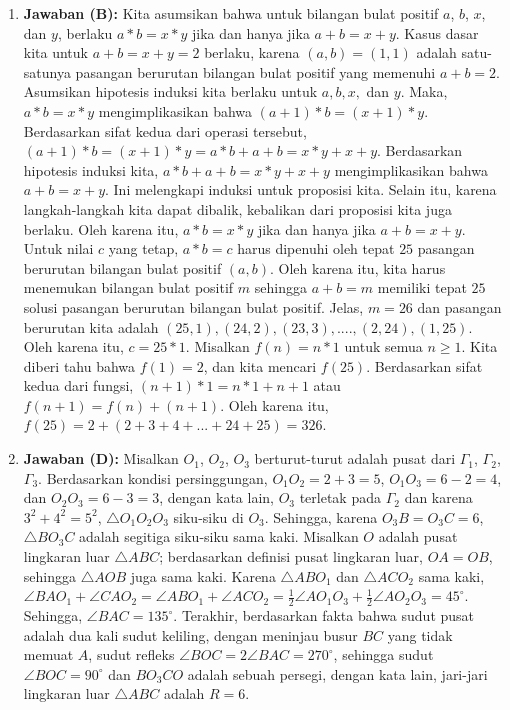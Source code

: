\documentclass{article}
\begin{document}
\begin{enumerate}
\item \textbf{Jawaban (B):} Kita asumsikan bahwa untuk bilangan bulat positif $a$, $b$, $x$, dan $y$, berlaku $a*b=x*y$ jika dan hanya jika $a+b=x+y$. Kasus dasar kita untuk $a+b=x+y=2$ berlaku, karena $(a,b)=(1,1)$ adalah satu-satunya pasangan berurutan bilangan bulat positif yang memenuhi $a+b=2$. Asumsikan hipotesis induksi kita berlaku untuk $a,b,x,$ dan $y$. Maka, $a*b=x*y$ mengimplikasikan bahwa $(a+1)*b=(x+1)*y$. Berdasarkan sifat kedua dari operasi tersebut, $(a+1)*b=(x+1)*y=a*b+a+b=x*y+x+y$. Berdasarkan hipotesis induksi kita, $a*b+a+b=x*y+x+y$ mengimplikasikan bahwa $a+b=x+y$. Ini melengkapi induksi untuk proposisi kita. Selain itu, karena langkah-langkah kita dapat dibalik, kebalikan dari proposisi kita juga berlaku. Oleh karena itu, $a*b=x*y$ jika dan hanya jika $a+b=x+y$. Untuk nilai $c$ yang tetap, $a*b=c$ harus dipenuhi oleh tepat $25$ pasangan berurutan bilangan bulat positif $(a, b)$. Oleh karena itu, kita harus menemukan bilangan bulat positif $m$ sehingga $a+b=m$ memiliki tepat $25$ solusi pasangan berurutan bilangan bulat positif. Jelas, $m=26$ dan pasangan berurutan kita adalah $(25,1), (24, 2), (23, 3), ...., (2, 24), (1, 25)$. Oleh karena itu, $c=25*1$. Misalkan $f(n)=n*1$ untuk semua $n\ge1$. Kita diberi tahu bahwa $f(1)=2$, dan kita mencari $f(25)$. Berdasarkan sifat kedua dari fungsi, $(n+1)*1=n*1+n+1$ atau $f(n+1)=f(n)+(n+1)$. Oleh karena itu, $f(25)=2+(2+3+4+...+24+25)=326$.

\item \textbf{Jawaban (D):} Misalkan $O_{1}$, $O_{2}$, $O_{3}$ berturut-turut adalah pusat dari $\Gamma_{1}$, $\Gamma_{2}$, $\Gamma_{3}$. Berdasarkan kondisi persinggungan, $O_{1}O_{2}=2+3=5$, $O_{1}O_{3}=6-2=4$, dan $O_{2}O_{3}=6-3=3$, dengan kata lain, $O_{3}$ terletak pada $\Gamma_{2}$ dan karena $3^{2}+4^{2}=5^{2}$, $\triangle O_{1}O_{2}O_{3}$ siku-siku di $O_{3}$. Sehingga, karena $O_{3}B=O_{3}C=6$, $\triangle BO_{3}C$ adalah segitiga siku-siku sama kaki. Misalkan $O$ adalah pusat lingkaran luar $\triangle ABC$; berdasarkan definisi pusat lingkaran luar, $OA=OB$, sehingga $\triangle AOB$ juga sama kaki. Karena $\triangle ABO_{1}$ dan $\triangle ACO_{2}$ sama kaki, $\angle BAO_{1}+\angle CAO_{2}=\angle ABO_{1}+\angle ACO_{2}=\frac{1}{2}\angle AO_{1}O_{3}+\frac{1}{2}\angle AO_{2}O_{3}=45^{\circ}$. Sehingga, $\angle BAC=135^{\circ}$. Terakhir, berdasarkan fakta bahwa sudut pusat adalah dua kali sudut keliling, dengan meninjau busur $BC$ yang tidak memuat $A$, sudut refleks $\angle BOC=2\angle BAC=270^{\circ}$, sehingga sudut $\angle BOC=90^{\circ}$ dan $BO_{3}CO$ adalah sebuah persegi, dengan kata lain, jari-jari lingkaran luar $\triangle ABC$ adalah $R=6$.


\end{enumerate}
\end{document}
